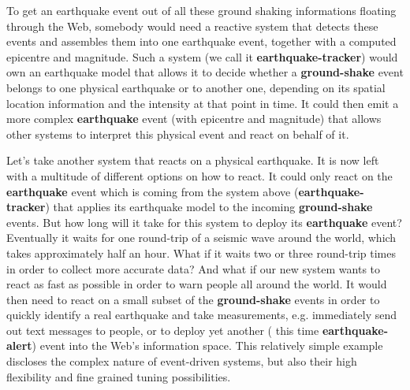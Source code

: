 To get an earthquake event out of all these ground shaking informations floating through the Web, somebody would need a reactive system that detects these events and assembles them into one earthquake event, together with a computed epicentre and magnitude.
Such a system (we call it \textrm{\textbf{earthquake-tracker}}) would own an earthquake model that allows it to decide whether a \textrm{\textbf{ground-shake}} event belongs to one physical earthquake or to another one, depending on its spatial location information and the intensity at that point in time.
It could then emit a more complex \textrm{\textbf{earthquake}} event (with epicentre and magnitude) that allows other systems to interpret this physical event and react on behalf of it.

Let's take another system that reacts on a physical earthquake.
It is now left with a multitude of different options on how to react.
It could only react on the \textrm{\textbf{earthquake}} event which is coming from the system above (\textrm{\textbf{earthquake-tracker}}) that applies its earthquake model to the incoming \textrm{\textbf{ground-shake}} events.
But how long will it take for this system to deploy its \textrm{\textbf{earthquake}} event?
Eventually it waits for one round-trip of a seismic wave around the world, which takes approximately half an hour.
What if it waits two or three round-trip times in order to collect more accurate data?
And what if our new system wants to react as fast as possible in order to warn people all around the world.
It would then need to react on a small subset of the \textrm{\textbf{ground-shake}} events in order to quickly identify a real earthquake and take measurements, e.g. immediately send out text messages to people, or to deploy yet another ( this time \textrm{\textbf{earthquake-alert}}) event into the Web's information space.
This relatively simple example discloses the complex nature of event-driven systems, but also their high flexibility and fine grained tuning possibilities.

